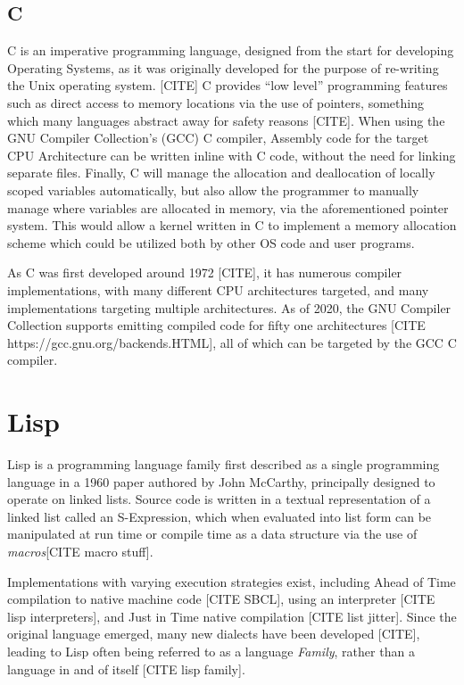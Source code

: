 \documentclass[11pt]{report}
\begin{document}
\subsection{C}
C is an imperative programming language, designed from the start for developing Operating Systems, as it was originally developed for the purpose of re-writing the Unix operating system. [CITE] C provides ``low level'' programming features such as direct access to memory locations via the use of pointers, something which many languages abstract away for safety reasons [CITE]. When using the GNU Compiler Collection's (GCC) C compiler, Assembly code for the target CPU Architecture can be written inline with C code, without the need for linking separate files. Finally, C will manage the allocation and deallocation of locally scoped variables automatically, but also allow the programmer to manually manage where variables are allocated in memory, via the aforementioned pointer system. This would allow a kernel written in C to implement a memory allocation scheme which could be utilized both by other OS code and user programs.

As C was first developed around 1972 [CITE], it has numerous compiler implementations, with many different CPU architectures targeted, and many implementations targeting multiple architectures. As of 2020, the GNU Compiler Collection supports emitting compiled code for fifty one architectures [CITE https://gcc.gnu.org/backends.HTML], all of which can be targeted by the GCC C compiler.

\section{Lisp}
Lisp is a programming language family first described as a single programming language in a 1960 paper authored by John McCarthy, principally designed to operate on linked lists. Source code is written in a textual representation of a linked list called an S-Expression, which when evaluated into list form can be manipulated at run time or compile time as a data structure via the use of \textit{macros}[CITE macro stuff].

Implementations with varying execution strategies exist, including Ahead of Time compilation to native machine code [CITE SBCL], using an interpreter [CITE lisp interpreters], and Just in Time native compilation [CITE list jitter]. Since the original language emerged, many new dialects have been developed [CITE], leading to Lisp often being referred to as a language \textit{Family}, rather than a language in and of itself [CITE lisp family].
\end{document}
